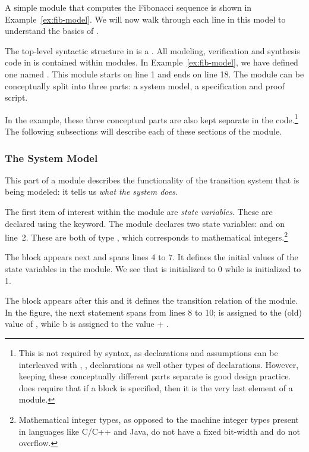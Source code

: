 A simple \uclid{} module that computes the Fibonacci sequence is shown in Example~\ref{ex:fib-model}.  We will now walk through each line in this model to understand the basics of \uclid{}.

The top-level syntactic structure in \uclid{} is a . All modeling, verification and synthesis code in \uclid{} is contained within modules. In Example~\ref{ex:fib-model}, we have defined one  named . This module starts on line 1 and ends on line 18. The module can be conceptually split into three parts: a system model, a specification and proof script. 

In the example, these three conceptual parts are also kept separate in the code.\footnote{This is not required by \uclid{} syntax, as  declarations and assumptions can be interleaved with , ,  declarations as well other types of declarations. However, keeping these conceptually different parts separate is good design practice. \uclid{} does require that if a  block is specified, then it is the very last element of a module.} The following subsections will describe each of these sections of the module. 

\subsubsection{The System Model}
This part of a \uclid{} module describes the functionality of the transition system that is being modeled: it tells us \emph{what the system does}.

The first item of interest within the module  are \emph{state variables}. These are declared using the  keyword. The module  declares two state variables:  and  on line~2. These are both of type , which corresponds to mathematical integers.\footnote{Mathematical integer types, as opposed to the machine integer types present in languages like C/C++ and Java, do not have a fixed bit-width and do not overflow.}

The  block appears next and spans lines 4 to 7. It defines the initial values of the state variables in the module. We see that  is initialized to 0 while  is initialized to 1.

The  block appears after this and it defines the transition relation of the module. In the figure, the next statement spans from lines 8 to 10;  is assigned to the (old) value of , while b is assigned to the value  + .

